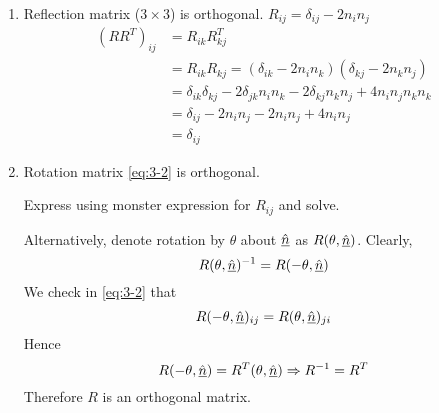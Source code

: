 \documentclass{article}
\numberwithin{equation}{section}
\begin{document}
\begin{eg}\leavevmode
    \begin{enumerate}
        \item Reflection matrix ($3 \times 3$) is orthogonal. $R_{ij} = \delta_{ij} - 2 n_i n_j$
        \begin{align*}
            (RR^T)_{ij} &= R_{ik}R_{kj}^T \\
            &= R_{ik}R_{kj} = (\delta_{ik} - 2 n_i n_k)(\delta_{kj} - 2 n_k n_j) \\
            &= \delta_{ik}\delta_{kj} - 2\delta_{jk}n_in_k - 2\delta_{kj}n_kn_j + 4n_in_jn_kn_k \\
            &= \delta_{ij} - 2 n_in_j -2 n_in_j + 4 n_in_j \\
            &= \delta_{ij}
        \end{align*}
        \item Rotation matrix \eqref{eq:3-2} is orthogonal.
        \begin{ex}
            Express using monster expression for $R_{ij}$ and solve.
        \end{ex}
        Alternatively, denote rotation by $\theta$ about $\hat{\underline{n}}$ as $R(\theta, \hat{\underline{n}})$. 
        Clearly,
        \[
            R(\theta, \hat{\underline{n}})^{-1} = R(-\theta, \hat{\underline{n}})    
        \]
        We check in \eqref{eq:3-2} that
        \[
            R(-\theta, \hat{\underline{n}})_{ij} = R(\theta, \hat{\underline{n}})_{ji}
        \]
        Hence
        \[
            R(-\theta, \hat{\underline{n}}) = R^T(\theta, \hat{\underline{n}}) \Rightarrow R^{-1} = R^T
        \]
        Therefore $R$ is an orthogonal matrix.
    \end{enumerate}
\end{eg}
\end{document}
